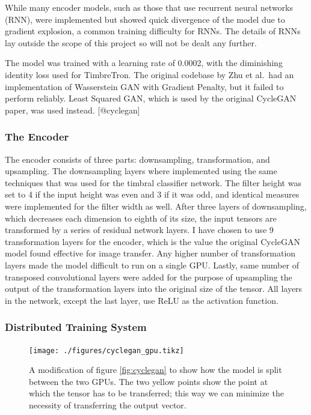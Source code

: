 \documentclass[]{report}
\begin{document}
While many encoder models, such as those that use recurrent neural
networks (RNN), were implemented but showed quick divergence of the
model due to gradient explosion, a common training difficulty for RNNs.
The details of RNNs lay outside the scope of this project so will not be
dealt any further.

The model was trained with a learning rate of 0.0002, with the
diminishing identity loss used for TimbreTron. The original codebase by
Zhu et al.~had an implementation of Wasserstein GAN with Gradient
Penalty, but it failed to perform reliably. Least Squared GAN, which is
used by the original CycleGAN paper, was used instead. {[}@cyclegan{]}

\hypertarget{the-encoder}{%
\subsubsection{The Encoder}\label{the-encoder}}

The encoder consists of three parts: downsampling, transformation, and
upsampling. The downsampling layers where implemented using the same
techniques that was used for the timbral classifier network. The filter
height was set to 4 if the input height was even and 3 if it was odd,
and identical measures were implemented for the filter width as well.
After three layers of downsampling, which decreases each dimension to
eighth of its size, the input tensors are transformed by a series of
residual network layers. I have chosen to use 9 transformation layers
for the encoder, which is the value the original CycleGAN model found
effective for image transfer. Any higher number of transformation layers
made the model difficult to run on a single GPU. Lastly, same number of
transposed convolutional layers were added for the purpose of upsampling
the output of the transformation layers into the original size of the
tensor. All layers in the network, except the last layer, use ReLU as
the activation function.

\hypertarget{distributed-training-system}{%
\subsubsection{Distributed Training
System}\label{distributed-training-system}}

\begin{figure}[h]
    \texttt{[image: ./figures/cyclegan\_gpu.tikz]}
    \centering
    \caption{A modification of figure \ref{fig:cyclegan} to show how the model is split between the two GPUs. The two yellow points show the point at which the tensor has to be transferred; this way we can minimize the necessity of transferring the output vector.} \label{fig:cyclegan_gpu}
\end{figure}
\end{document}
